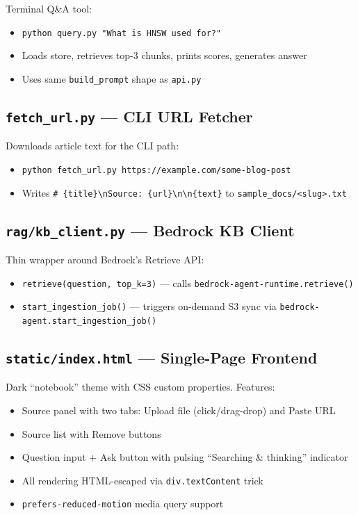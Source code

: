 \documentclass[11pt,a4paper]{paper}
\begin{document}
Terminal Q\&A tool:
\begin{itemize}
  \item \texttt{python query.py "What is HNSW used for?"}
  \item Loads store, retrieves top-3 chunks, prints scores, generates answer
  \item Uses same \texttt{build\_prompt} shape as \texttt{api.py}
\end{itemize}

\subsection{\texttt{fetch\_url.py} — CLI URL Fetcher}

Downloads article text for the CLI path:
\begin{itemize}
  \item \texttt{python fetch\_url.py https://example.com/some-blog-post}
  \item Writes \texttt{\# \{title\}\textbackslash nSource: \{url\}\textbackslash n\textbackslash n\{text\}} to \texttt{sample\_docs/<slug>.txt}
\end{itemize}

\subsection{\texttt{rag/kb\_client.py} — Bedrock KB Client}

Thin wrapper around Bedrock's Retrieve API:
\begin{itemize}
  \item \texttt{retrieve(question, top\_k=3)} — calls \texttt{bedrock-agent-runtime.retrieve()}
  \item \texttt{start\_ingestion\_job()} — triggers on-demand S3 sync via \texttt{bedrock-agent.start\_ingestion\_job()}
\end{itemize}

\subsection{\texttt{static/index.html} — Single-Page Frontend}

Dark ``notebook'' theme with CSS custom properties. Features:
\begin{itemize}
  \item Source panel with two tabs: Upload file (click/drag-drop) and Paste URL
  \item Source list with Remove buttons
  \item Question input + Ask button with pulsing ``Searching \& thinking'' indicator
  \item All rendering HTML-escaped via \texttt{div.textContent} trick
  \item \texttt{prefers-reduced-motion} media query support
\end{itemize}
\end{document}
